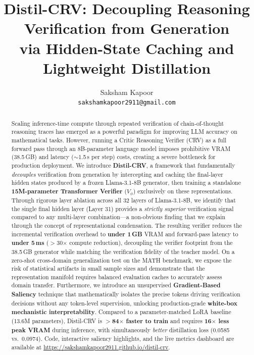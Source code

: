 \documentclass{article}
\title{Distil-CRV: Decoupling Reasoning Verification from Generation\\via Hidden-State Caching and Lightweight Distillation}
\author{Saksham Kapoor \\
\texttt{sakshamkapoor2911@gmail.com}
}
\begin{document}
\maketitle

\begin{abstract}
Scaling inference-time compute through repeated verification of chain-of-thought reasoning traces has emerged as a powerful paradigm for improving LLM accuracy on mathematical tasks. However, running a Critic Reasoning Verifier (CRV) as a full forward pass through an 8B-parameter language model imposes prohibitive VRAM (38.5\,GB) and latency ($\sim$1.5\,s per step) costs, creating a severe bottleneck for production deployment. We introduce \textbf{Distil-CRV}, a framework that fundamentally \emph{decouples} verification from generation by intercepting and caching the final-layer hidden states produced by a frozen Llama-3.1-8B generator, then training a standalone \textbf{15M-parameter Transformer Verifier} ($V_\phi$) exclusively on these representations. Through rigorous layer ablation across all 32 layers of Llama-3.1-8B, we identify that the single final hidden layer (Layer 31) provides a \emph{strictly superior} verification signal compared to any multi-layer combination---a non-obvious finding that we explain through the concept of representational condensation. The resulting verifier reduces the incremental verification overhead to \textbf{under 1\,GB} VRAM and forward-pass latency to \textbf{under 5\,ms} ($>$30$\times$ compute reduction), decoupling the verifier footprint from the 38.5\,GB generator while matching the verification fidelity of the teacher model. On a zero-shot cross-domain generalization test on the MATH benchmark, we expose the risk of statistical artifacts in small sample sizes and demonstrate that the representation manifold requires balanced evaluation caches to accurately assess domain transfer. Furthermore, we introduce an unsupervised \textbf{Gradient-Based Saliency} technique that mathematically isolates the precise tokens driving verification decisions without any token-level supervision, unlocking production-grade \textbf{white-box mechanistic interpretability}. Compared to a parameter-matched LoRA baseline (13.6M parameters), Distil-CRV is \textbf{$>$84$\times$ faster to train} and requires \textbf{16$\times$ less peak VRAM} during inference, with simultaneously \emph{better} distillation loss (0.0585 vs.\ 0.0974). Code, interactive saliency highlights, and the live metrics dashboard are available at \url{https://sakshamkapoor2911.github.io/distil-crv}.
\end{abstract}
\end{document}

